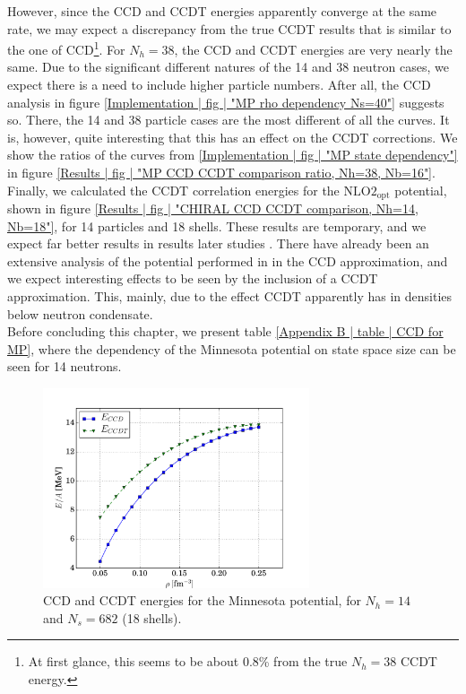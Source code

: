 \documentclass[10pt,twoside]{report}
\begin{document}
	However, since the CCD and CCDT energies apparently converge at the same rate, we may expect a discrepancy from the true CCDT results that is similar to the one of CCD\footnote{At first glance, this seems to be about 0.8\% from the true $N_h=38$ CCDT energy.}. For $N_h=38$, the CCD and CCDT energies are very nearly the same. Due to the significant different natures of the 14 and 38 neutron cases, we expect there is a need to include higher particle numbers. After all, the CCD analysis in figure \ref{Implementation | fig | "MP rho dependency Ns=40"} suggests so. There, the 14 and 38 particle cases are the most different of all the curves. It is, however, quite interesting that this has an effect on the CCDT corrections. We show the ratios of the curves from \ref{Implementation | fig | "MP state dependency"} in figure \ref{Results | fig | "MP CCD CCDT comparison ratio, Nh=38, Nb=16"}.\\
		
	Finally, we calculated the CCDT correlation energies for the $\text{NLO2}_{\text{opt}}$ potential, shown in figure \ref{Results | fig | "CHIRAL CCD CCDT comparison, Nh=14, Nb=18"}, for 14 particles and 18 shells. These results are temporary, and we expect far better results in results later studies \cite{MillerHjorthJensen17}. There have already been an extensive analysis of the potential performed in \cite{GHagen14} in the CCD approximation, and we expect interesting effects to be seen by the inclusion of a CCDT approximation. This, mainly, due to the effect CCDT apparently has in densities below neutron condensate.\\
	
	Before concluding this chapter, we present table \ref{Appendix B | table | CCD for MP}, where the dependency of the Minnesota potential on state space size can be seen for 14 neutrons.
	
	
	\begin{figure}
		\centering
		\captionsetup{width=.8\textwidth}
		\hspace{0.35cm}
		\includegraphics[width=0.7\textwidth]{Figures/MP_CCDT_COMPARISON.pdf}
		\caption{CCD and CCDT energies for the Minnesota potential, for $N_h=14$ and $N_s=682$ (18 shells).}
		\label{Results | fig | "MP CCD CCDT comparison, Nh=14, Nb=18"}
	\end{figure}
	
\end{document}
